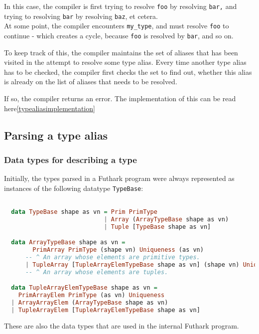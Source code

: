 \begin{enumerate}
    In this case, the compiler is first trying to resolve \texttt{foo} by
    resolving \texttt{bar,} and trying to resolving \texttt{bar} by resolving \texttt{baz}, et cetera. \\
    At some point, the compiler encounters \texttt{my_type}, and must resolve \texttt{foo} to
    continue - which creates a cycle, because \texttt{foo} is resolved by \texttt{bar}, and so on.

    To keep track of this, the compiler maintains the set of aliases that has
    been visited in the attempt to resolve some type alias. Every time another
    type alias has to be checked, the compiler first checks the set to find out,
    whether this alias is already on the list of aliases that needs to be
    resolved.

    If so, the compiler returns an error.
    The implementation of this can be read here\ref{typealiasimplementation}

    
\end{enumerate}
\subsection{Parsing a type alias}


\subsubsection{Data types for describing a type}
Initially, the types parsed in a Futhark program were always represented as instances of the
following datatype \texttt{TypeBase}:
\begin{lstlisting}[language=Haskell]

  data TypeBase shape as vn = Prim PrimType
                            | Array (ArrayTypeBase shape as vn)
                            | Tuple [TypeBase shape as vn]

  data ArrayTypeBase shape as vn =
        PrimArray PrimType (shape vn) Uniqueness (as vn)
      -- ^ An array whose elements are primitive types.
      | TupleArray [TupleArrayElemTypeBase shape as vn] (shape vn) Uniqueness
      -- ^ An array whose elements are tuples.

  data TupleArrayElemTypeBase shape as vn =
    PrimArrayElem PrimType (as vn) Uniqueness
  | ArrayArrayElem (ArrayTypeBase shape as vn)
  | TupleArrayElem [TupleArrayElemTypeBase shape as vn]
\end{lstlisting}

These are also the data types that are used in the internal Futhark program.

